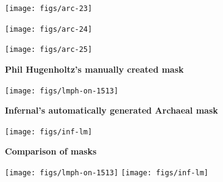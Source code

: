 \documentclass[landscape]{slides}
\begin{document}
\begin{slide}\begin{center}\texttt{[image: figs/arc-23]}\end{center}\vfill\end{slide}
\begin{slide}\begin{center}\texttt{[image: figs/arc-24]}\end{center}\vfill\end{slide}
\begin{slide}\begin{center}\texttt{[image: figs/arc-25]}\end{center}\vfill\end{slide}
\begin{slide}
\begin{center}
\large
\textbf{Phil Hugenholtz's manually created mask}
\end{center}
\small

\begin{center}
\texttt{[image: figs/lmph-on-1513]}

\end{center}
\vfill
\end{slide}
\begin{slide}
\begin{center}
\large
\textbf{Infernal's automatically generated Archaeal mask}
\end{center}
\small

\begin{center}
\texttt{[image: figs/inf-lm]}

\end{center}
\vfill
\end{slide}
\begin{slide}
\begin{center}
\large
\textbf{Comparison of masks}
\end{center}
\small

\begin{center}
\texttt{[image: figs/lmph-on-1513]}
\texttt{[image: figs/inf-lm]}

\end{center}
\vfill
\end{slide}
\end{document}
